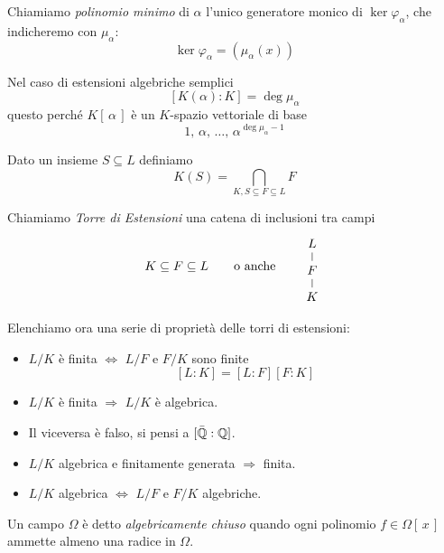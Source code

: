 \begin{multicols}{2}
\begin{definition}
	Chiamiamo \emph{polinomio minimo} di $ \alpha $ l'unico generatore monico di $ \ker\varphi_\alpha $, che indicheremo con $ \mu_\alpha $:
	\[ \ker\varphi_\alpha = (\mu_\alpha(x)) \]
\end{definition}

\begin{remark}
	Nel caso di estensioni algebriche semplici \[ [K(\alpha) : K ] = \deg \mu_\alpha \] questo perché $ K[\,\alpha\,] $ è un $ K $-spazio vettoriale di base $$  1,\, \alpha,\, \dots,\, \alpha^{\deg \mu_\alpha-1}  $$
\end{remark}

\begin{definition}
	Dato un insieme $ S \subseteq L $  definiamo
	\[ K(S) = \bigcap_{K, S \subseteq F \subseteq L} F  \]
\end{definition}

\begin{definition}
	Chiamiamo \emph{Torre di Estensioni} una catena di inclusioni tra campi
	\[ K \subseteq F \subseteq L \qquad\text{o anche}\qquad \begin{tikzcd}[row sep=0.25cm]
	L \arrow [d,-] \\
	F \arrow [d,-] \\
	K
	\end{tikzcd} \]
\end{definition}

Elenchiamo ora una serie di proprietà delle torri di estensioni:

\begin{itemize}
	\item $ L/K $ è finita $ \Leftrightarrow $ $ L/F $ e $ F/K $ sono finite
	\[ [L : K] = [L : F][F : K] \]
	
	\item $ L/K $ è finita $ \Rightarrow $ $ L/K $ è algebrica.
	
	\item Il viceversa è falso, si pensi a $ [\bar{\mathbb{Q}} : \mathbb{Q}] $.
	
	\item $ L/K $ algebrica e finitamente generata $ \Rightarrow $ finita.
	
	\item $ L/K $ algebrica $ \Leftrightarrow $ $ L/F $ e $ F/K $ algebriche.
	
	
\end{itemize}

\begin{definition}
	Un campo $ \Omega $ è detto \emph{algebricamente chiuso} quando ogni polinomio $ f \in \Omega[\, x\,] $ ammette almeno una radice in $ \Omega $.
\end{definition}


\end{multicols}
